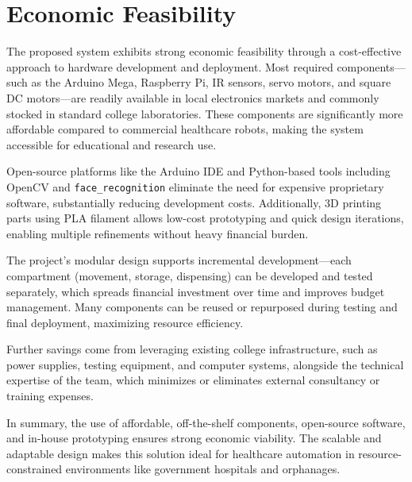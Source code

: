 \section{Economic Feasibility}

The proposed system exhibits strong economic feasibility through a cost-effective approach to hardware development and deployment. Most required components—such as the Arduino Mega, Raspberry Pi, IR sensors, servo motors, and square DC motors—are readily available in local electronics markets and commonly stocked in standard college laboratories. These components are significantly more affordable compared to commercial healthcare robots, making the system accessible for educational and research use.

Open-source platforms like the Arduino IDE and Python-based tools including OpenCV and \texttt{face\_recognition} eliminate the need for expensive proprietary software, substantially reducing development costs. Additionally, 3D printing parts using PLA filament allows low-cost prototyping and quick design iterations, enabling multiple refinements without heavy financial burden.

The project’s modular design supports incremental development—each compartment (movement, storage, dispensing) can be developed and tested separately, which spreads financial investment over time and improves budget management. Many components can be reused or repurposed during testing and final deployment, maximizing resource efficiency.

Further savings come from leveraging existing college infrastructure, such as power supplies, testing equipment, and computer systems, alongside the technical expertise of the team, which minimizes or eliminates external consultancy or training expenses.

In summary, the use of affordable, off-the-shelf components, open-source software, and in-house prototyping ensures strong economic viability. The scalable and adaptable design makes this solution ideal for healthcare automation in resource-constrained environments like government hospitals and orphanages.
